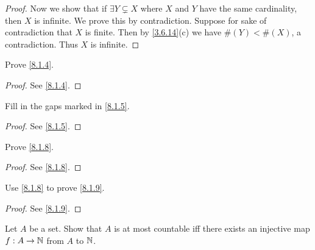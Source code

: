 \begin{proof}
	Now we show that if \(\exists Y \subsetneq X\) where \(X\) and \(Y\) have the same cardinality, then \(X\) is infinite.
	We prove this by contradiction.
	Suppose for sake of contradiction that \(X\) is finite.
	Then by \cref{3.6.14}(c) we have \(\#(Y) < \#(X)\), a contradiction.
	Thus \(X\) is infinite.
\end{proof}

\begin{ex}\label{ex:8.1.2}
	Prove \cref{8.1.4}.
\end{ex}

\begin{proof}
	See \cref{8.1.4}.
\end{proof}

\begin{ex}\label{ex:8.1.3}
	Fill in the gaps marked in \cref{8.1.5}.
\end{ex}

\begin{proof}
	See \cref{8.1.5}.
\end{proof}

\begin{ex}\label{ex:8.1.4}
	Prove \cref{8.1.8}.
\end{ex}

\begin{proof}
	See \cref{8.1.8}.
\end{proof}

\begin{ex}\label{ex:8.1.5}
	Use \cref{8.1.8} to prove \cref{8.1.9}.
\end{ex}

\begin{proof}
	See \cref{8.1.9}.
\end{proof}

\begin{ex}\label{ex:8.1.6}
	Let \(A\) be a set.
	Show that \(A\) is at most countable iff there exists an injective map \(f : A \to \mathbb{N}\) from \(A\) to \(\mathbb{N}\).
\end{ex}

